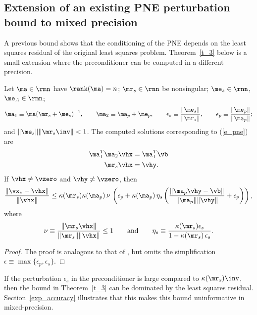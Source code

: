 \documentclass[final]{siamart220329}%
\begin{document}
\subsection{Extension of an existing PNE perturbation bound to mixed precision}\label{PNE_gen}
A previous bound \cite[Theorem 2.1]{ipsen2025solutionsquaresproblemsrandomized} 
shows that the conditioning of the PNE depends on the least squares residual of the original least squares problem.
Theorem~\ref{t_3} below is a small extension where  
the preconditioner can be computed in a different precision. 

\begin{theorem}\label{t_3}
Let $\ma\in\rmn$ have $\rank(\ma)=n$; $\mr_s\in\rnn$ be nonsingular; $\me_s\in\rnn$, $\me_A\in\rmn$; 
\begin{align*}
\ma_1\equiv \ma(\mr_s+\me_s)^{-1},\qquad \ma_2\equiv \ma_p+\me_p, \qquad
\epsilon_s\equiv\frac{\|\me_s\|}{\|\mr_s\|}, \qquad \epsilon_p\equiv\frac{\|\me_p\|}{\|\ma_p\|};
\end{align*}
and $\|\me_s\|\|\mr_s\inv\|<1$. The computed solutions corresponding 
to (\ref{e_pne}) are 
\begin{align}
\ma_1^T\ma_2\vhx&=\ma_1^T\vb\label{e_t211}\\
\mr_s\vhx&=\vhy.\label{e_pne22}
\end{align}
If  $\vhx\neq \vzero$ and $\vhy\neq \vzero$, then
\begin{align*}
\frac{\|\vx_*-\vhx\|}{\|\vhx\|}\leq \kappa(\mr_s)\kappa(\ma_p)\,\nu\,
\left(\epsilon_p+\kappa(\ma_p)\, \eta_s
\left(\frac{\|\ma_p\vhy-\vb\|}{\|\ma_p\|\|\vhy\|}+\epsilon_p\right)\right),
\end{align*}
where 
\begin{align*}
\nu\equiv \frac{\|\mr_s\vhx\|}{\|\mr_s\| \|\vhx\|}\leq 1\qquad \text{and}\qquad
\eta_s\equiv \frac{\kappa(\mr_s)\epsilon_s}{1-\kappa(\mr_s)\,\epsilon_s}. 
\end{align*}
\end{theorem}

\begin{proof}
The proof is analogous to that of \cite[Theorem 2.1]{ipsen2025solutionsquaresproblemsrandomized}, but omits
the simplification $\epsilon\equiv\max\{\epsilon_p,\epsilon_s\}$. 
\end{proof}

If the perturbation $\epsilon_s$ in the preconditioner is large compared to $\kappa(\mr_s)\inv$, then the bound in Theorem~\ref{t_3} can be dominated by the least squares residual. Section~\ref{exp_accuracy} illustrates that this makes this bound uninformative in mixed-precision. 
\end{document}
